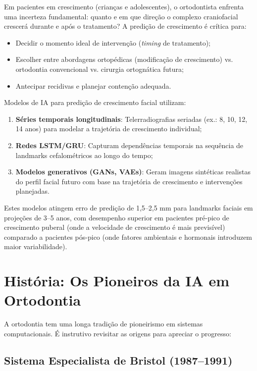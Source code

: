 Em pacientes em crescimento (crianças e adolescentes), o ortodontista enfrenta uma incerteza fundamental: quanto e em que direção o complexo craniofacial crescerá durante e após o tratamento? A predição de crescimento é crítica para:
\begin{itemize}
    \item Decidir o momento ideal de intervenção (\textit{timing} de tratamento);
    \item Escolher entre abordagens ortopédicas (modificação de crescimento) vs. ortodontia convencional vs. cirurgia ortognática futura;
    \item Antecipar recidivas e planejar contenção adequada.
\end{itemize}

Modelos de IA para predição de crescimento facial utilizam:
\begin{enumerate}
    \item \textbf{Séries temporais longitudinais}: Telerradiografias seriadas (ex.: 8, 10, 12, 14 anos) para modelar a trajetória de crescimento individual;
    \item \textbf{Redes LSTM/GRU}: Capturam dependências temporais na sequência de landmarks cefalométricos ao longo do tempo;
    \item \textbf{Modelos generativos (GANs, VAEs)}: Geram imagens sintéticas realistas do perfil facial futuro com base na trajetória de crescimento e intervenções planejadas.
\end{enumerate}

Estes modelos atingem erro de predição de 1,5--2,5 mm para landmarks faciais em projeções de 3--5 anos, com desempenho superior em pacientes pré-pico de crescimento puberal (onde a velocidade de crescimento é mais previsível) comparado a pacientes pós-pico (onde fatores ambientais e hormonais introduzem maior variabilidade).

\section{História: Os Pioneiros da IA em Ortodontia}

A ortodontia tem uma longa tradição de pioneirismo em sistemas computacionais. É instrutivo revisitar as origens para apreciar o progresso:

\subsection{Sistema Especialista de Bristol (1987--1991)}

